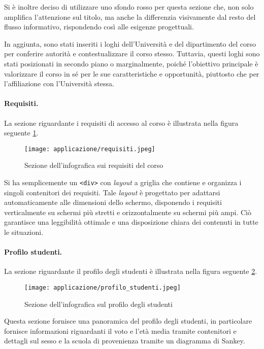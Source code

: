 Si è inoltre deciso di utilizzare uno sfondo rosso per questa sezione che, non solo amplifica l'attenzione sul titolo, ma anche la differenzia
visivamente dal resto del flusso informativo, rispondendo così alle esigenze progettuali.
 
In aggiunta, sono stati inseriti i loghi dell'Università e del dipartimento del corso per conferire autorità e contestualizzare il corso stesso. 
Tuttavia, questi loghi sono stati posizionati in secondo piano o marginalmente, poiché l'obiettivo principale è valorizzare il corso in sé per le sue caratteristiche e opportunità, 
piuttosto che per l'affiliazione con l'Università stessa.

\paragraph{Requisiti.} La sezione riguardante i requisiti di accesso al corso è illustrata nella figura seguente \ref{fig:requisiti}.
\begin{figure}[H] 
    \centering 
    \texttt{[image: applicazione/requisiti.jpeg]} 
    \caption{Sezione dell'infografica sui requisiti del corso}
    \label{fig:requisiti}
\end{figure}
\noindent Si ha semplicemente un \texttt{<div>} con \emph{layout} a griglia che contiene e organizza i singoli contenitori dei requisiti.
Tale \emph{layout} è progettato per adattarsi automaticamente alle dimensioni dello schermo, disponendo i requisiti verticalmente su schermi 
più stretti e orizzontalmente su schermi più ampi. Ciò garantisce una leggibilità ottimale e una disposizione 
chiara dei contenuti in tutte le situazioni.

\paragraph{Profilo studenti.} La sezione riguardante il profilo degli studenti è illustrata nella figura seguente \ref{fig:app_profilo_stud}. 
\begin{figure}[H] 
    \centering 
    \texttt{[image: applicazione/profilo\_studenti.jpeg]} 
    \caption{Sezione dell'infografica sul profilo degli studenti}
    \label{fig:app_profilo_stud}
\end{figure}
\noindent Questa sezione fornisce una panoramica del profilo degli studenti, in particolare fornisce informazioni riguardanti il voto e l'età media 
tramite contenitori e dettagli sul sesso e la scuola di provenienza tramite un diagramma di Sankey.

